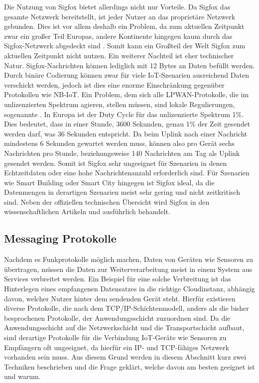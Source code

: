 Die Nutzung von Sigfox bietet allerdings nicht nur Vorteile. Da Sigfox das gesamte Netzwerk bereitstellt, ist jeder Nutzer an das proprietäre Netzwerk gebunden. Dies ist vor allem deshalb ein Problem, da zum aktuellen Zeitpunkt zwar ein großer Teil Europas, andere Kontinente hingegen kaum durch das Sigfox-Netzwerk abgedeckt sind . Somit kann ein Großteil der Welt Sigfox zum aktuellen Zeitpunkt nicht nutzen. Ein weiterer Nachteil ist eher technischer Natur. Sigfox-Nachrichten können lediglich mit 12 Bytes an Daten befüllt werden. Durch binäre Codierung können zwar für viele IoT-Szenarien ausreichend Daten verschickt werden, jedoch ist dies eine enorme Einschränkung gegenüber Protokollen wie NB-IoT. Ein Problem, dem sich alle LPWAN-Protokolle, die im unlizenzierten Spektrum agieren, stellen müssen, sind lokale Regulierungen, sogenannte . In Europa ist der Duty Cycle für das unlizenzierte Spektrum 1\%. Dies bedeutet, dass in einer Stunde, 3600 Sekunden, genau 1\% der Zeit gesendet werden darf, was 36 Sekunden entspricht. Da beim Uplink nach einer Nachricht mindestens 6 Sekunden gewartet werden muss, können also pro Gerät sechs Nachrichten pro Stunde, beziehungsweise 140 Nachrichten am Tag als Uplink gesendet werden. Somit ist Sigfox sehr ungeeignet für Szenarien in denen Echtzeitdaten oder eine hohe Nachrichtenanzahl erforderlich sind. Für Szenarien wie Smart Building oder Smart City hingegen ist Sigfox ideal, da die Datenmengen in derartigen Szenarien meist sehr gering und nicht zeitkritisch sind. Neben der offiziellen technischen Übersicht  wird Sigfox in den wissenschaftlichen Artikeln \cite{Aernouts.2018} und \cite{Chaudhari.2020} ausführlich behandelt.


\subsection{Messaging Protokolle}
\label{sec:ThHi:messaging}

Nachdem es Funkprotokolle möglich machen, Daten von Geräten wie Sensoren zu übertragen, müssen die Daten zur Weiterverarbeitung meist in einem System aus Services verbreitet werden. Ein Beispiel für eine solche Verbreitung ist das Hinterlegen eines empfangenen Datensatzes in die richtige Cloudinstanz, abhängig davon, welcher Nutzer hinter dem sendenden Gerät steht. Hierfür existieren diverse Protokolle, die nach dem TCP/IP-Schichtenmodell, anders als die bisher besprochenen Protokolle, der Anwendungsschicht zuzuordnen sind. Da die Anwendungsschicht auf die Netzwerkschicht und die Transportschicht aufbaut, sind derartige Protokolle für die Verbindung IoT-Geräte wie Sensoren zu Empfängern oft ungeeignet, da hierfür ein IP- und TCP-fähiges Netzwerk vorhanden sein muss. Aus diesem Grund werden in diesem Abschnitt kurz zwei Techniken beschrieben und die Frage geklärt, welche davon am besten geeignet ist und warum.

